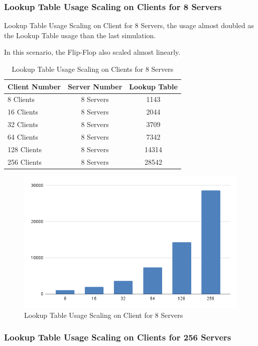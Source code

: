 \subsubsection{Lookup Table Usage Scaling on Clients for 8 Servers}

Lookup Table Usage Scaling on Client for 8 Servers, the usage almost doubled as the Lookup Table usage than the last simulation.

In this scenario, the Flip-Flop also scaled almost linearly. 

\begin{table}[htb]
	\centering
	\caption{Lookup Table Usage Scaling on Clients for 8 Servers}
	\begin{tabular}{l c c}
		\toprule
    	Client Number  & Server Number  & Lookup Table\\ \midrule
        8	Clients	&	8	Servers	&	1143	\\
        16	Clients	&	8	Servers	&	2044	\\
        32	Clients	&	8	Servers	&	3709	\\
        64	Clients	&	8	Servers	&	7342	\\
        128	Clients	&	8	Servers	&	14314	\\
        256	Clients	&	8	Servers	&	28542	\\
		\bottomrule
	\end{tabular}
	\label{tab:luts8}
\end{table}

 \begin{figure}[h]
	\centering
	\includegraphics[width=.7\linewidth]{figures/Scaling/LUTS8.png}
	\caption{Lookup Table Usage Scaling on Client for 8 Servers}
	\label{fig:luts8}
\end{figure}

\newpage
\subsubsection{Lookup Table Usage Scaling on Clients for 256 Servers}

